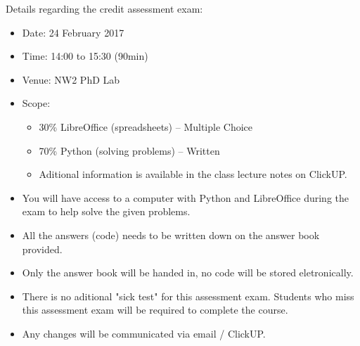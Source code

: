     \noindent
    Details regarding the credit assessment exam:
    \begin{itemize}
        \item Date: 24 February 2017
        \item Time: 14:00 to 15:30 (90min)
        \item Venue: NW2 PhD Lab
        \item Scope:
        \begin{itemize}
            \item 30\% LibreOffice (spreadsheets) -- Multiple Choice
            \item 70\% Python (solving problems) -- Written
            \item Aditional information is available in the class lecture notes
                on ClickUP.
        \end{itemize}
        \item You will have access to a computer with Python and LibreOffice
            during the exam to help solve the given problems.
        \item All the answers (code) needs to be written down on the answer
            book provided.
        \item Only the answer book will be handed in, no code will be
            stored eletronically.
        \item There is no aditional "sick test" for this assessment exam.
            Students who miss this assessment exam will be required to complete
            the course.
        \item Any changes will be communicated via email / ClickUP.
    \end{itemize}

